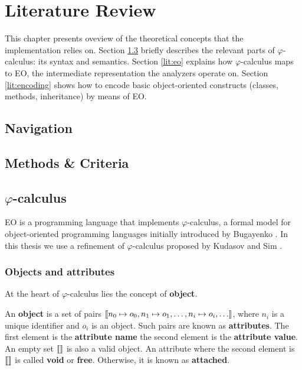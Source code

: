 \chapter{Literature Review}
\label{chap:lr}
This chapter presents oveview of the theoretical concepts that the implementation relies on. Section \ref{lit:phicalc} briefly describes the relevant parts of $\varphi$-calculus: its syntax and semantics. Section \ref{lit:eo} explains how $\varphi$-calculus maps to EO, the intermediate representation the analyzers operate on. Section \ref{lit:encoding} shows how to encode basic object-oriented constructs (classes, methods, inheritance) by means of EO. 

\section{Navigation}

\section{Methods \& Criteria}

\section{$\varphi$-calculus}
\label{lit:phicalc}

EO is a programming language that implements $\varphi$-calculus, a formal model for object-oriented programming languages initially introduced by Bugayenko \cite{eolang}. In this thesis we use a refinement of $\varphi$-calculus proposed by Kudasov and Sim \cite{kudasov}.

\subsection{Objects and attributes}
At the heart of $\varphi$-calculus lies the concept of \textbf{object}.

\begin{definition}
    An \textbf{object} is a set of pairs $\llbracket n_0 \mapsto o_0, n_1 \mapsto o_1, \hdots, n_i \mapsto o_i, \hdots \rrbracket$, where $n_i$ is a unique identifier and $o_i$ is an object. Such pairs are known as \textbf{attributes}. The first element is the \textbf{attribute name} the second element is the \textbf{attribute value}. An empty set $\llbracket  \rrbracket$ is also a valid object. An attribute where the second element is $\llbracket  \rrbracket$ is called \textbf{void} or \textbf{free}. Otherwise, it is known as \textbf{attached}.
\end{definition}

